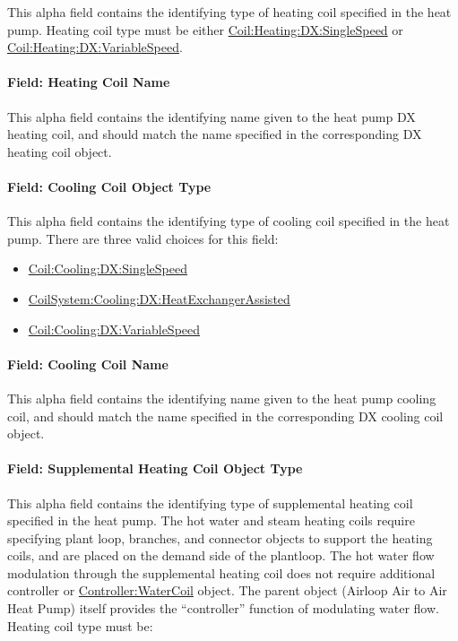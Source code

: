 This alpha field contains the identifying type of heating coil specified in the heat pump. Heating coil type must be either \hyperref[coilheatingdxsinglespeed]{Coil:Heating:DX:SingleSpeed} or \hyperref[coilheatingdxvariablespeed]{Coil:Heating:DX:VariableSpeed}.

\paragraph{Field: Heating Coil Name}\label{field-heating-coil-name-3}

This alpha field contains the identifying name given to the heat pump DX heating coil, and should match the name specified in the corresponding DX heating coil object.

\paragraph{Field: Cooling Coil Object Type}\label{field-cooling-coil-object-type-3}

This alpha field contains the identifying type of cooling coil specified in the heat pump. There are three valid choices for this field:

\begin{itemize}
\item
  \hyperref[coilcoolingdxsinglespeed]{Coil:Cooling:DX:SingleSpeed}
\item
  \hyperref[coilsystemcoolingdxheatexchangerassisted]{CoilSystem:Cooling:DX:HeatExchangerAssisted}
\item
  \hyperref[coilcoolingdxvariablespeed]{Coil:Cooling:DX:VariableSpeed}
\end{itemize}

\paragraph{Field: Cooling Coil Name}\label{field-cooling-coil-name-3}

This alpha field contains the identifying name given to the heat pump cooling coil, and should match the name specified in the corresponding DX cooling coil object.

\paragraph{Field: Supplemental Heating Coil Object Type}\label{field-supplemental-heating-coil-object-type-1}

This alpha field contains the identifying type of supplemental heating coil specified in the heat pump. The hot water and steam heating coils require specifying plant loop, branches, and connector objects to support the heating coils, and are placed on the demand side of the plantloop. The hot water flow modulation through the supplemental heating coil does not require additional controller or \hyperref[controllerwatercoil]{Controller:WaterCoil} object. The parent object (Airloop Air to Air Heat Pump) itself provides the ``controller'' function of modulating water flow. Heating coil type must be:

